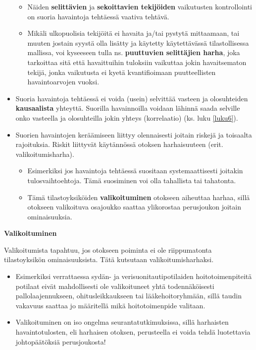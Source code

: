 \documentclass[
]{book}
\providecommand{\tightlist}{%
  \setlength{\itemsep}{0pt}\setlength{\parskip}{0pt}}
\begin{document}
\begin{itemize}
  \begin{itemize}
  \tightlist
  \item
    Näiden \textbf{selittävien} ja \textbf{sekoittavien tekijöiden} vaikutusten kontrollointi on suoria havaintoja tehtäessä vaativa tehtävä.
  \item
    Mikäli ulkopuolisia tekijöitä ei havaita ja/tai pystytä mittaamaan, tai muuten jostain syystä olla lisätty ja käytetty käytettävässä tilastollisessa mallissa, voi kyseeseen tulla ns. \textbf{puuttuvien selittäjien harha}, joka tarkoittaa sitä että havaittuihin tuloksiin vaikuttaa jokin havaitsematon tekijä, jonka vaikutusta ei kyetä kvantifioimaan puutteellisten havaintoarvojen vuoksi.
  \end{itemize}
\item
  Suoria havaintoja tehtäessä ei voida (usein) selvittää vasteen ja olosuhteiden \textbf{kausaalista} yhteyttä. Suorilla havainnoilla voidaan lähinnä saada selville onko vasteella ja olosuhteilla jokin yhteys (korrelaatio) (ks. luku \ref{luku6}).
\item
  Suorien havaintojen keräämiseen liittyy olennaisesti joitain riskejä ja toisaalta rajoituksia. Riskit liittyvät käytännössä otoksen harhaisuuteen (erit. valikoitumisharha).

  \begin{itemize}
  \tightlist
  \item
    Esimerkiksi jos havaintoja tehtäessä suositaan systemaattisesti joitakin tulosvaihtoehtoja. Tämä suosiminen voi olla tahallista tai tahatonta.
  \item
    Tämä tilastoyksiköiden \textbf{valikoituminen} otokseen aiheuttaa harhaa, sillä otokseen valikoituva osajoukko saattaa ylikorostaa perusjoukon joitain ominaisuuksia.
  \end{itemize}
\end{itemize}

\begin{defblock}{}

\textbf{Valikoituminen}

Valikoitumista tapahtuu, jos otokseen poiminta ei ole riippumatonta tilastoyksikön ominaisuuksista. Tätä kutsutaan valikoitumisharhaksi.

\begin{itemize}
\item
  Esimerkiksi verrattaessa sydän- ja verisuonitautipotilaiden hoitotoimenpiteitä potilaat eivät mahdollisesti ole valikoituneet yhtä todennäköisesti pallolaajennukseen, ohitusleikkaukseen tai lääkehoitoryhmään, sillä taudin vakavuus saattaa jo määritellä mikä hoitotoimenpide valitaan.
\item
  Valikoituminen on iso ongelma seurantatutkimuksissa, sillä harhaisten havaintotulosten, eli harhaisen otoksen, perusteella ei voida tehdä luotettavia johtopäätöksiä perusjoukosta!
\end{itemize}

\end{defblock}
\end{document}
